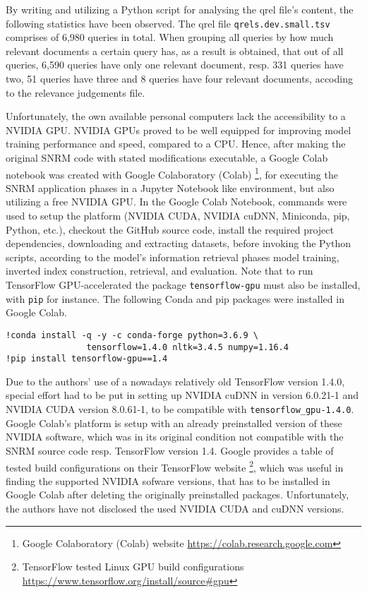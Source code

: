 By writing and utilizing a Python script for analysing the qrel file's content, the following statistics have been observed.
The qrel file \texttt{qrels.dev.small.tsv} comprises of 6,980 queries in total.
When grouping all queries by how much relevant documents a certain query has, as a result is obtained, that 
    out of all queries, 6,590 queries have only one relevant document, resp. 331 queries have two, 
    51 queries have three and 8 queries have four relevant documents, accoding to the relevance judgements file.

Unfortunately, the own available personal computers lack the accessibility to a NVIDIA GPU.
NVIDIA GPUs proved to be well equipped for improving model training performance and speed, compared to a CPU.
Hence, after making the original SNRM code with stated modifications executable, a Google Colab notebook was created
    with Google Colaboratory (Colab) \footnote{Google Colaboratory (Colab) website \url{https://colab.research.google.com}},
    for executing the SNRM application phases in a Jupyter Notebook like environment, 
    but also utilizing a free NVIDIA GPU.
In the Google Colab Notebook, commands were used to setup the platform (NVIDIA CUDA, NVIDIA cuDNN, Miniconda, pip, Python, etc.),
    checkout the GitHub source code,
    install the required project dependencies, downloading and extracting datasets,
    before invoking the Python scripts, according to the model's information retrieval phases
    model training, inverted index construction, retrieval, and evaluation.
Note that to run TensorFlow GPU-accelerated the package \verb|tensorflow-gpu| must also be installed,
    with \verb|pip| for instance.
The following Conda and pip packages were installed in Google Colab.
\begin{verbatim}
!conda install -q -y -c conda-forge python=3.6.9 \
                tensorflow=1.4.0 nltk=3.4.5 numpy=1.16.4
!pip install tensorflow-gpu==1.4
\end{verbatim}

Due to the authors' use of a nowadays relatively old TensorFlow version 1.4.0, special effort had to be put in setting up
    NVIDIA cuDNN in version 6.0.21-1 and NVIDIA CUDA version 8.0.61-1, to be compatible with \verb|tensorflow_gpu-1.4.0|.
Google Colab's platform is setup with an already preinstalled version of these NVIDIA software, which was in its original condition
    not compatible with the SNRM source code resp. TensorFlow version 1.4.
Google provides a table of tested build configurations on their TensorFlow website
    \footnote{TensorFlow tested Linux GPU build configurations \url{https://www.tensorflow.org/install/source\#gpu}}, 
    which was useful in finding the supported NVIDIA sofware versions, that has to be installed in Google Colab 
    after deleting the originally preinstalled packages.
Unfortunately, the authors have not disclosed the used NVIDIA CUDA and cuDNN versions.


